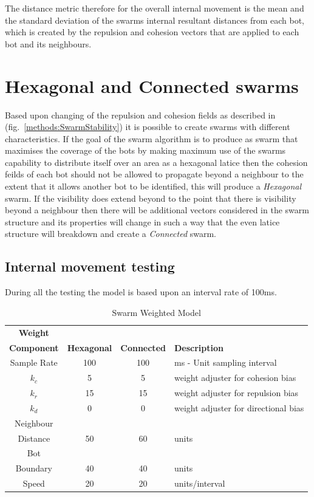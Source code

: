 \documentclass[10pt,journal,letterpaper,twoside]{IEEEtran}
\newcommand{\swarmA}{Hexagonal}
\newcommand{\swarmB}{Connected}
\newcommand{\stability}{internal movement}
\newcommand{\Stability}{Internal movement}
\newcommand{\Fig}{fig.}
\begin{document}
The distance metric therefore for the overall \stability{} is the mean and the standard deviation of the swarms internal resultant distances from each bot, which is created by the repulsion and cohesion vectors that are applied to each bot and its neighbours.

\section{\swarmA{} and \swarmB{} swarms\label{methods:SwarmTypesStability1}}

Based upon changing of the repulsion and cohesion fields as described in (\Fig{}~\ref{methods:SwarmStability}) it is possible to create swarms with different characteristics. If the goal of the swarm algorithm is to produce as swarm that maximises the coverage of the bots by making maximum use of the swarms capability to distribute itself over an area as a hexagonal latice then the cohesion feilds of each bot should not be allowed to propagate beyond a neighbour to the extent that it allows another bot to be identified, this will produce a \textit{\swarmA{}} swarm. If the visibility does extend beyond to the point that there is visibility beyond a neighbour then there will be additional vectors considered in the swarm structure and its properties will change in such a way that the even latice structure will breakdown and create a \textit{\swarmB{}} swarm.

\subsection{\Stability{} testing}\label{Section:StabilityTesting}

During all the testing the model is based upon an interval rate of 100ms.

\begin{center}
\begin{table}[H]
\begin{tabular}{ c | c | c | p{3cm}}
\bf Weight \\\bf Component & \bf \swarmA{} & \bf \swarmB{} & \bf Description \\ \hline
Sample Rate & 100 & 100 & ms - Unit sampling interval\\  \hline
$k_c$ & 5 & 5 & weight adjuster for cohesion bias\\  \hline
$k_r$ & 15 & 15 & weight adjuster for repulsion  bias\\  \hline
$k_d$ & 0 & 0 & weight adjuster for directional bias\\  \hline
Neighbour \\ Distance & 50 & 60 &  units\\  \hline
Bot \\ Boundary & 40 & 40 & units\\  \hline
Speed & 20 & 20 & units/interval\\  \hline
\end{tabular}
\caption{Swarm Weighted Model} \label{tab:Physics2}
\end{table}
\end{center}
\end{document}
